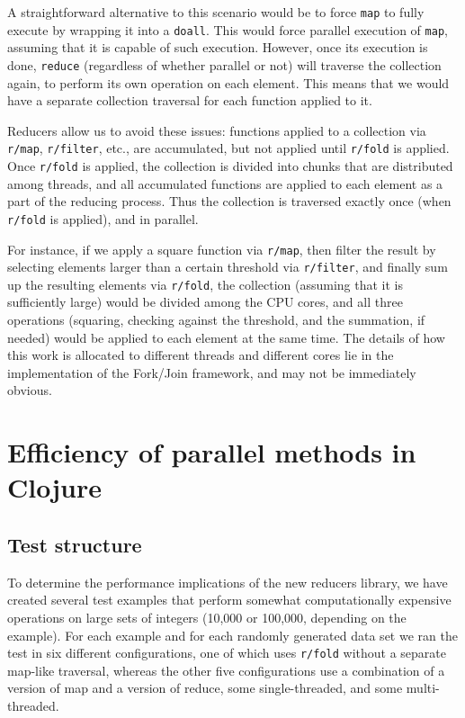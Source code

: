 \documentclass[12pt]{article}
\newcommand{\comment}[1]{{\bf \tt  {#1}}}
\newcommand{\emcomment}[1]{\textcolor{ForestGreen}{\comment{Elena: {#1}}}}
\newcommand{\clocode}[1]{{\texttt {#1}}}
\begin{document}
A straightforward  alternative to this scenario would be to force \clocode{map} to fully execute by wrapping it into a \clocode{doall}. This would force parallel execution of  \clocode{map}, assuming that it is capable of such execution. However, once its execution is done, \clocode{reduce} (regardless of whether parallel or not) will traverse the collection again, to perform its own operation on each element. This means that we would have a separate collection traversal for each function applied to it. 

Reducers allow us to avoid these issues: functions applied to a collection via \clocode{r/map}, \clocode{r/filter}, etc., are accumulated, but not applied until \clocode{r/fold} is applied. Once \clocode{r/fold} is applied, the collection is divided into chunks that are distributed among threads, and all accumulated functions are applied to each element as a part of the reducing process.
Thus the collection is traversed exactly once (when \clocode{r/fold} is applied), and in parallel. 

For instance, if we apply a square function via \clocode{r/map}, then filter the result by selecting elements larger than a certain threshold via \clocode{r/filter}, and finally sum up the resulting elements via \clocode{r/fold}, the collection (assuming that it is sufficiently large) would be divided among the CPU cores, and all three operations (squaring, checking against the threshold, and the summation, if needed) would be applied to each element at the same time. 
The details of how this work is allocated to different threads and different cores lie in the implementation of the Fork/Join framework, and may not be immediately obvious. 


\section{Efficiency of parallel methods in Clojure}\label{sec:efficiency} 

\subsection{Test structure}\label{sec:testStruct}
To determine the performance implications of the new reducers library, we have created several test examples that perform somewhat computationally expensive operations on large sets of integers (10,000 or 100,000, depending on the example). For each example and for each randomly generated data set we ran the test in six different configurations, one of which uses \clocode{r/fold} without a separate map-like traversal, whereas the other five configurations use a combination of a version of map and a version of reduce, some single-threaded, and some multi-threaded. 
\end{document}
